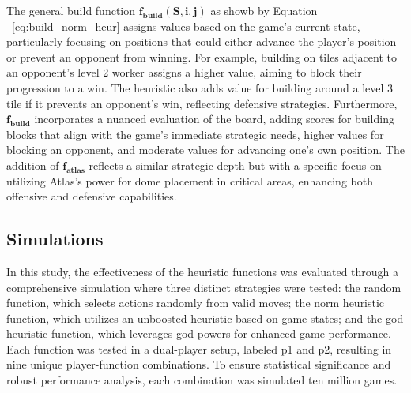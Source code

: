 \documentclass{telkomnika}
\begin{document}
The general build function $\mathbf{f}_{\mathbf{build}}(\mathbf{S}, \mathbf{i}, \mathbf{j})$ as showb by Equation ~\ref{eq:build_norm_heur} assigns values based on the game's current state, particularly focusing on positions that could either advance the player's position or prevent an opponent from winning. For example, building on tiles adjacent to an opponent's level 2 worker assigns a higher value, aiming to block their progression to a win. The heuristic also adds value for building around a level 3 tile if it prevents an opponent's win, reflecting defensive strategies. Furthermore, $\mathbf{f}_{\mathbf{build}}$ incorporates a nuanced evaluation of the board, adding scores for building blocks that align with the game's immediate strategic needs, higher values for blocking an opponent, and moderate values for advancing one's own position. The addition of $\mathbf{f}_{\mathbf{atlas}}$ reflects a similar strategic depth but with a specific focus on utilizing Atlas's power for dome placement in critical areas, enhancing both offensive and defensive capabilities.


\subsection{Simulations}
In this study, the effectiveness of the heuristic functions was evaluated through a comprehensive simulation where three distinct strategies were tested: the random function, which selects actions randomly from valid moves; the norm heuristic function, which utilizes an unboosted heuristic based on game states; and the god heuristic function, which leverages god powers for enhanced game performance. Each function was tested in a dual-player setup, labeled p1 and p2, resulting in nine unique player-function combinations. To ensure statistical significance and robust performance analysis, each combination was simulated ten million games.
\end{document}
